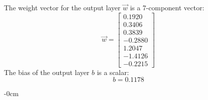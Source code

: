 \documentclass[metals,article,submit,pdftex,moreauthors]{Definitions/mdpi}
\begin{document}
The weight vector for the output layer $\overrightarrow{w}$ is a 7-component vector:
\begin{equation*}
\overrightarrow{w} = \left[
\begin{array}{r}
	0.1920  \\
	0.3406  \\
	0.3839  \\
	-0.2880 \\
	1.2047  \\
	-1.4126 \\
	-0.2215
\end{array}\right]
\end{equation*}
The bias of the output layer $b$ is a scalar:
\begin{equation*}
b = 0.1178
\end{equation*}

\begin{adjustwidth}{-\extralength}{0cm}





%


\PublishersNote{}
\end{adjustwidth}
\end{document}
